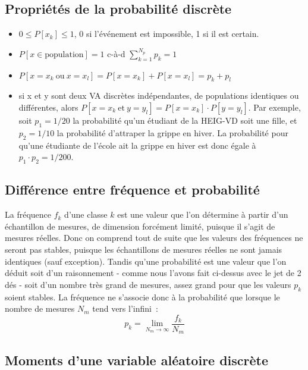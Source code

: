 \subsection{Propriétés de la probabilité discrète}

\begin{itemize}\itemsep1pt
\renewcommand{\labelitemi}{$\bullet$}
\item $0\le P[x_k]\le 1$, 0 si l'événement est impossible, 1 si il est certain.
\item $P[x\in\text{population}]=1$ c-à-d $\sum_{k=1}^{N_p} p_k=1$
\item $P[x=x_k\ \text{ou}\ x=x_l]=P[x=x_k]+P[x=x_l]=p_k+p_l$
\item si x et y sont deux VA discrètes indépendantes, de populations identiques ou différentes, alors $P[x=x_k\ \text{et}\ y=y_l]=P[x=x_k]\cdot P[y=y_l]$. Par exemple, soit $p_1=1/20$ la probabilité qu'un étudiant de la HEIG-VD soit une fille, et $p_2=1/10$ la probabilité d'attraper la grippe en hiver. La probabilité pour qu'une étudiante de l'école ait la grippe en hiver est donc égale à $p_1\cdot p_2=1/200$.
\end{itemize}

\subsection{Différence entre fréquence et probabilité}

La fréquence $f_k$ d'une classe $k$ est une valeur que l'on détermine à partir d'un échantillon de mesures, de dimension forcément limité, puisque il s'agit de mesures réelles. Donc on comprend tout de suite que les valeurs des fréquences ne seront pas stables, puisque les échantillons de mesures réelles ne sont jamais identiques (sauf exception). Tandis qu'une probabilité est une valeur que l'on déduit soit d'un raisonnement - comme nous l'avons fait ci-dessus avec le jet de 2 dés - soit d'un nombre très grand de mesures, assez grand pour que les valeurs $p_k$ soient stables. La fréquence ne s'associe donc à la probabilité que lorsque le nombre de mesures $N_m$ tend vers l'infini~:
\begin{equation}
p_k=\lim_{N_m\rightarrow\infty}\frac{f_k}{N_m}
\end{equation}

\subsection{Moments d'une variable aléatoire discrète}\label{par:mdvad}


